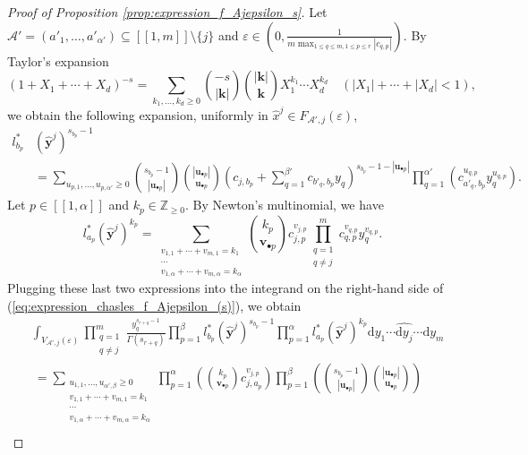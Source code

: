 \documentclass[10pt,a4paper]{amsart}
\newcommand{\dd}{\mathrm{d}}
\begin{document}
\begin{proof}[Proof of Proposition \ref{prop:expression_f_Ajepsilon_s}]
Let $\mathcal{A}'=(a'_1,\ldots,a'_{\alpha'}) \subseteq [\![1,m]\!] \setminus \{ j \}$ and $\varepsilon \in (0,\frac{1}{m \max_{1 \leq q \leq m, 1 \leq p \leq r}|c_{q,p}|})$. By Taylor's expansion
$$ (1+X_1+\cdots+X_d)^{-s} = \sum_{k_1,\ldots,k_d \geq 0} \binom{-s}{|\mathbf{k}|} \binom{|\mathbf{k}|}{\mathbf{k}} X_1^{k_1} \cdots X_{d}^{k_d} \quad (|X_1|+\cdots+|X_d|<1), $$
we obtain the following expansion, uniformly in $\widehat{x}^j \in F_{\mathcal{A}',j}(\varepsilon)$,
\begin{align*}
    l^*_{b_p}&(\widehat{\mathbf{y}}^j)^{s_{b_p}-1} \\
    &= \sum_{u_{p,1}, \ldots, u_{p,\alpha'} \geq 0} \binom{s_{b_p}-1}{|\mathbf{u}_{\bullet p}|} \binom{|\mathbf{u}_{\bullet p}|}{\mathbf{u}_{\bullet p}} \left( c_{j,b_p}+\sum_{q=1}^{\beta'} c_{b'_q,b_p} y_q \right)^{s_{b_p}-1-|\mathbf{u}_{\bullet p}|} \prod_{q=1}^{\alpha'} \left(c_{a'_q,b_p}^{u_{q,p}} y_{q}^{u_{q,p}}\right).
\end{align*}
Let $p \in [\![ 1, \alpha ]\!]$ and $k_p \in \mathbb{Z}_{\geq 0}$. By Newton's multinomial, we have
$$ l^*_{a_p}(\widehat{\mathbf{y}}^j)^{k_p} = \sum_{\substack{v_{1,1}+\cdots+v_{m,1}=k_1 \\ \cdots \\ v_{1,\alpha}+\cdots+v_{m,\alpha}=k_{\alpha}}}  \binom{k_p}{\mathbf{v}_{\bullet p}} c_{j,p}^{v_{j,p}} \prod_{\substack{q=1 \\ q \neq j}}^m c_{q,p}^{v_{q,p}} y_{q}^{v_{q,p}}. $$
Plugging these last two expressions into the integrand on the right-hand side of (\ref{eq:expression_chasles_f_Ajepsilon_(s)}), we obtain
\begin{align}
    &\int_{V_{\mathcal{A}',j}(\varepsilon)} \prod_{\substack{q=1 \\ q \neq j}}^{m} \frac{y_q^{s_{r+q}-1}}{\Gamma(s_{r+q})} \prod_{p=1}^{\beta} l^*_{b_p}(\widehat{\mathbf{y}}^j)^{s_{b_p}-1} \prod_{p=1}^{\alpha} l^*_{a_p}(\widehat{\mathbf{y}}^j)^{k_p} \dd y_1 \cdots \widehat{\dd y_{j}} \cdots \dd y_{m} \nonumber \\
    & \ = \sum_{\substack{ u_{1,1},\ldots,u_{\alpha',\beta} \geq 0 \\ v_{1,1}+\cdots+v_{m,1}=k_1 \\ \cdots \\ v_{1,\alpha}+\cdots+v_{m,\alpha}=k_{\alpha}}} \prod_{p=1}^{\alpha} \left( \binom{k_p}{\mathbf{v}_{\bullet p}} c_{j,a_p}^{v_{j,p}} \right) \prod_{p=1}^{\beta} \left( \binom{s_{b_p}-1}{|\mathbf{u}_{\bullet p}|} \binom{|\mathbf{u}_{\bullet p}|}{\mathbf{u}_{\bullet p}} \right) \label{eq:taylor_series_injection_f_AJepsilon_s} \\

\end{align}
\end{proof}
\end{document}
